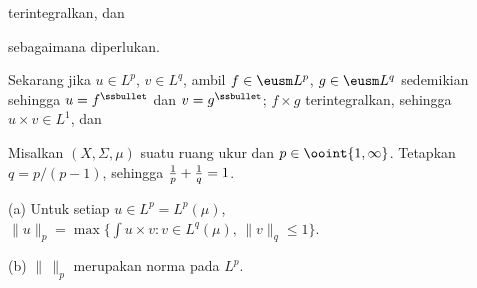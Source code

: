 {

\noindent terintegralkan, dan


\noindent sebagaimana diperlukan.

\medskip

 Sekarang jika $u\in L^p$, $v\in L^q$, ambil
$f\in\eusm L^p$, $g\in \eusm L^q$ sedemikian sehingga
$u=f^{\ssbullet}$ dan $v=g^{\ssbullet}$; $f\times g$ terintegralkan,
sehingga $u\times v\in L^1$, dan

}


 Misalkan $(X,\Sigma,\mu)$ suatu ruang ukur dan
$p\in\ooint{1,\infty}$. Tetapkan $q=p/(p-1)$, sehingga
${1\over p}+{1\over q}=1$.

(a) Untuk setiap $u\in L^p=L^p(\mu)$,
$\|u\|_p=\max\{\int u\times v:v\in L^q(\mu),\,\|v\|_q\le 1\}$.

(b) $\|\,\|_p$ merupakan norma pada $L^p$.

